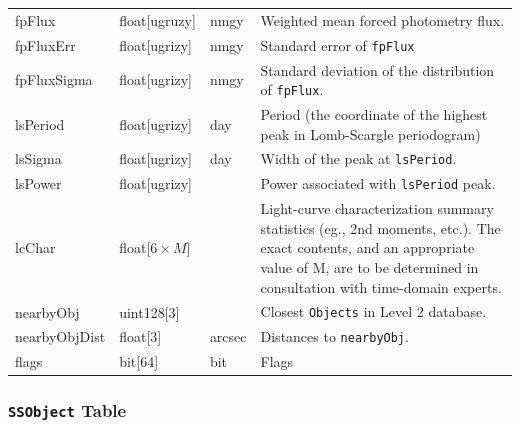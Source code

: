 \documentclass[12pt]{article}
\newcommand{\code}[1]{\texttt{#1}}
\newcommand{\DR}{{Level 2 database}\xspace}
\newcommand{\Objects}{\code{Objects}\xspace}
\newcommand{\SSObject}{\code{SSObject}\xspace}
\begin{document}
\begin{center}
\begin{longtable}{p{3cm}p{2cm}p{2cm}p{5cm}}
fpFlux & float[ugruzy] & nmgy & Weighted mean forced photometry flux.\\

fpFluxErr & float[ugrizy] & nmgy & Standard error of {\tt fpFlux} \\ 

fpFluxSigma & float[ugrizy] & nmgy & Standard deviation of the distribution of {\tt fpFlux}. \\ 

lsPeriod  & float[ugrizy] & day & Period (the coordinate of the highest peak in Lomb-Scargle periodogram) \\

lsSigma  & float[ugrizy] & day & Width of the peak at \texttt{lsPeriod}. \\

lsPower   & float[ugrizy] & ~ & Power associated with \texttt{lsPeriod} peak. \\

lcChar   & float[$6\times{}M$] & ~ & Light-curve characterization summary statistics (eg., 2nd moments, etc.). The exact contents, and an appropriate value of M, are to be determined in consultation with time-domain experts. \\

nearbyObj   & uint128[3] & ~ & Closest \Objects in \DR. \\

nearbyObjDist   & float[3] & arcsec & Distances to \texttt{nearbyObj}. \\

flags & bit[64] & bit & Flags \\ \hline

\end{longtable}
\end{center}

\subsubsection{\SSObject Table}
\end{document}
